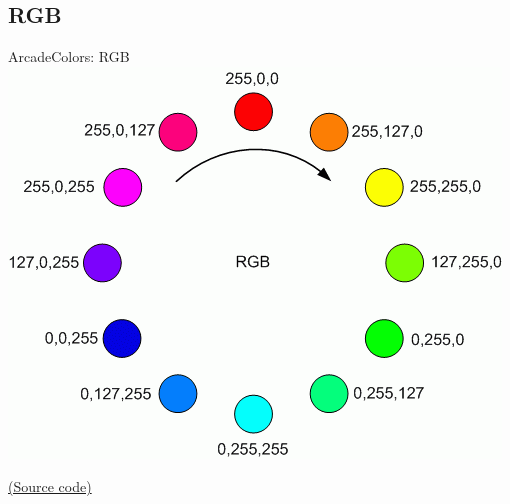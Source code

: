 \documentclass[10pt,compress]{beamer} %
\begin{document}
\subsection{RGB}
\begin{frame}{Arcade}{Colors: RGB}
	\centering \includegraphics[width=0.5\linewidth]{figs/rgb.png}
    \bigskip

    \href{https://www.freestylersupport.com/wiki/tutorial:sequences_ideas:rainbow_tutorial}{(Source code)}
\end{frame}
\end{document}
